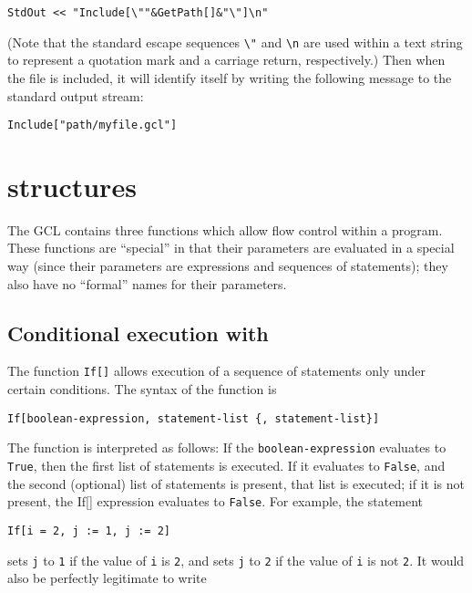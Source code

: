 \begin{verbatim}
StdOut << "Include[\""&GetPath[]&"\"]\n"
\end{verbatim}

\noindent
(Note that the standard escape sequences \verb+\"+ and \verb+\n+ are
used within a text string to represent a quotation mark and a carriage
return, respectively.)  Then when the file is included, it will identify
itself by writing the following message to the standard output stream:

\begin{verbatim}
Include["path/myfile.gcl"]
\end{verbatim}


\section{ structures}

The GCL contains three functions which allow flow control within a
program.  These functions are ``special'' in that their parameters are
evaluated in a special way (since their parameters are expressions and
sequences of statements); they also have no ``formal'' names for their
parameters.

\subsection{Conditional execution with }

The function \verb+If[]+ allows execution of a sequence of statements
only under certain conditions.  The syntax of the function is

\begin{verbatim}
If[boolean-expression, statement-list {, statement-list}]
\end{verbatim}

\noindent The function is interpreted as follows: If the
\verb+boolean-expression+ evaluates to \verb+True+, then the first
list of statements is executed.  If it evaluates to \verb+False+, and
the second (optional) list of statements is present, that list is
executed; if it is not present, the If[] expression evaluates to \verb+False+.
For example, the statement

\begin{verbatim}
If[i = 2, j := 1, j := 2]
\end{verbatim}

\noindent sets \verb+j+ to \verb+1+ if the value of \verb+i+ is
\verb+2+, and sets \verb+j+ to \verb+2+ if the value of \verb+i+ is
not \verb+2+.  It would also be perfectly legitimate to write


